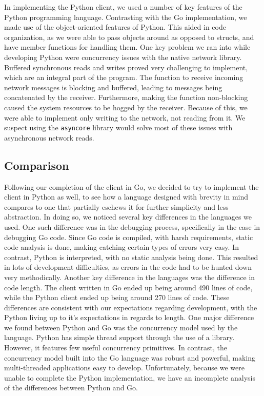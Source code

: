 \documentclass[12pt, letterpaper]{article}
\begin{document}

In implementing the Python client, we used a number of key features
of the Python programming language. Contrasting with the Go implementation,
we made use of the object-oriented features of Python. This aided in code
organization, as we were able to pass objects around as opposed to structs,
and have member functions for handling them. One key problem we ran into
while developing Python were concurrency issues with the native network
library. Buffered
synchronous reads and writes proved very challenging to implement, which
are an integral part of the program. The function to receive incoming
network messages is blocking and buffered, leading to messages being
concatenated by the receiver. Furthermore, making the function non-blocking
caused the system resources to be hogged by the receiver.
Because of this, we were able to implement only writing to the network,
not reading from it.
We suspect using the \verb+asyncore+ library would solve most of these
issues with asynchronous network reads.

\subsection*{Comparison}

Following our completion of the client in Go, we decided to try to
implement the
client in Python as well, to see how a language designed with brevity
in mind compares to one that partially eschews it for further simplicity
and less abstraction. In doing so, we noticed several key differences
in the languages we used. One such difference was in the debugging process,
specifically in the ease in debugging Go code. Since Go code is compiled,
with harsh requirements, static code analysis is done, making catching
certain types of errors very easy. In contrast, Python is interpreted,
with no static analysis being done. This resulted in lots of development
difficulties, as errors in the code had to be hunted down very methodically.
Another key difference in the languages was the difference in code length.
The client written in Go ended up being around
490 %
lines of code, while the Python client ended up being around
270  %
lines of code. These differences are consistent with our expectations
regarding development, with the Python living up to it's expectations
in regards to length. One major difference we found between Python and
Go was the concurrency model used by the language. Python has simple
thread support through the use of a library. However, it features
few useful concurrency primitives. In contrast, the concurrency model
built into the Go language was robust and powerful, making
multi-threaded applications easy to develop.
Unfortunately, because we were unable to complete the Python implementation,
we have an incomplete analysis of the differences between Python and Go.
\end{document}
